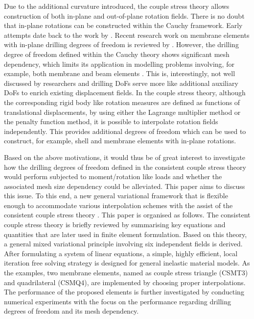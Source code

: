 \documentclass[3p,sort&compress,11pt,fleqn,review]{elsarticle}
\begin{document}
Due to the additional curvature introduced, the couple stress theory allows construction of both in-plane and out-of-plane rotation fields. There is no doubt that in-plane rotations can be constructed within the Cauchy framework. Early attempts date back to the work by \citet{Allman1984}. Recent research work on membrane elements with in-plane drilling degrees of freedom is reviewed by \citet{Boutagouga2020}. However, the drilling degree of freedom defined within the Cauchy theory shows significant mesh dependency, which limits its application in modelling problems involving, for example, both membrane and beam elements \citep{Chang2020}. This is, interestingly, not well discussed by researchers and drilling DoFs serve more like additional auxiliary DoFs to enrich existing displacement fields. In the couple stress theory, although the corresponding rigid body like rotation measures are defined as functions of translational displacements, by using either the Lagrange multiplier method or the penalty function method, it is possible to interpolate rotation fields independently. This provides additional degrees of freedom which can be used to construct, for example, shell and membrane elements with in-plane rotations.

Based on the above motivations, it would thus be of great interest to investigate how the drilling degrees of freedom defined in the consistent couple stress theory would perform subjected to moment/rotation like loads and whether the associated mesh size dependency could be alleviated. This paper aims to discuss this issue. To this end, a new general variational framework that is flexible enough to accommodate various interpolation schemes with the assist of the consistent couple stress theory \citep{Hadjesfandiari2011}. This paper is organised as follows. The consistent couple stress theory is briefly reviewed by summarising key equations and quantities that are later used in finite element formulation. Based on this theory, a general mixed variational principle involving six independent fields is derived. After formulating a system of linear equations, a simple, highly efficient, local iteration free solving strategy is designed for general inelastic material models. As the examples, two membrane elements, named as couple stress triangle (CSMT3) and quadrilateral (CSMQ4), are implemented by choosing proper interpolations. The performance of the proposed elements is further investigated by conducting numerical experiments with the focus on the performance regarding drilling degrees of freedom and its mesh dependency.
\end{document}
